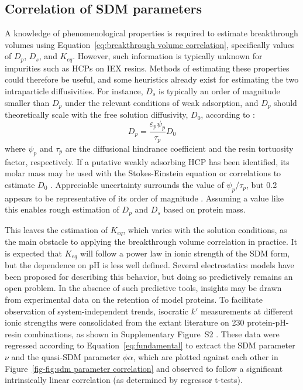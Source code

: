 \documentclass[preprint,review,12pt]{elsarticle}
\providecommand{\DIFaddtex}[1]{{\protect\color{blue}\uwave{#1}}} %
\providecommand{\DIFaddbegin}{} %
\providecommand{\DIFaddend}{} %
\providecommand{\DIFadd}[1]{\texorpdfstring{\DIFaddtex{#1}}{#1}} %
\begin{document}
    \subsection{Correlation of SDM parameters} \label{ssec:thermo corr}

        A knowledge of phenomenological properties is required to estimate breakthrough volumes using Equation~\ref{eq:breakthrough volume correlation}, specifically values of $D_p$, $D_s$, and $K_{eq}$. However, such information is typically unknown for impurities such as HCPs on IEX resins. Methods of estimating these properties could therefore be useful, and some heuristics already exist for estimating the two intraparticle diffusivities. For instance, $D_s$ is typically an order of magnitude smaller than $D_p$ under the relevant conditions of weak adsorption, and $D_p$ should theoretically scale with the free solution diffusivity, $D_0$, according to \cite{Carta2010a}:
        \begin{equation} \label{eq:tortuosity relationship}
            D_p = \frac{\varepsilon_p \psi_p}{\tau_p} D_0
        \end{equation}
        where $\psi_p$ and $\tau_p$ are the diffusional hindrance coefficient and the resin tortuosity factor, respectively. If a putative weakly adsorbing HCP has been identified, its molar mass may be used with the Stokes-Einstein equation or correlations to estimate $D_0$ \cite{Young1980}. Appreciable uncertainty surrounds the value of $\psi_p$/$\tau_p$, but 0.2 appears to be representative of its order of magnitude \cite{Angelo2016b}. Assuming a value like this enables rough estimation of $D_p$ and $D_s$ based on protein mass.



        This leaves the estimation of $K_{eq}$, which varies with the solution conditions, as the main obstacle to applying the breakthrough volume correlation in practice. It is expected that $K_{eq}$ will follow a power law in ionic strength of the SDM form, but the dependence on pH is less well defined. Several electrostatics models have been proposed for describing this behavior, but doing so predictively remains an open problem. In the absence of such predictive tools, insights may be drawn from experimental data on the retention of model proteins. To facilitate observation of system-independent trends, isocratic $k'$ measurements at different ionic strengths were consolidated from the extant literature on 230 protein-pH-resin combinations, as shown in Supplementary Figure~S2 \DIFaddbegin \DIFadd{and the accompanying spreadsheet }\DIFaddend \cite{Staby2000, Staby2001, Staby2004, Staby2005, Staby2006, Staby2007, DePhillips2001, DePhillips2004, Kumar2015, bai1999}. These data were regressed according to Equation~\ref{eq:fundamental} to extract the SDM parameter $\nu$ and the quasi-SDM parameter $\phi \alpha$, which are plotted against each other in Figure~\ref{fig-fig:sdm parameter correlation} and observed to follow a significant intrinsically linear correlation (as determined by regressor t-tests).
\end{document}
